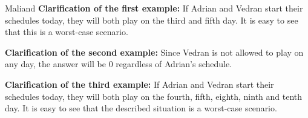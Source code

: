 \begin{statement}[
  problempoints=100,
  timelimit=2 seconds,
  memorylimit=512 MiB,
]{Maliand}
\textbf{Clarification of the first example:} If Adrian and Vedran start their schedules today, they will both play on the third and fifth day. It is easy to see that this is a worst-case scenario.

\textbf{Clarification of the second example:} Since Vedran is not allowed to play on any day, the answer will be $0$ regardless of Adrian's schedule.

\textbf{Clarification of the third example:} If Adrian and Vedran start their schedules today, they will both play on the fourth, fifth, eighth, ninth and tenth day. It is easy to see that the described situation is a worst-case scenario.

\end{statement}

